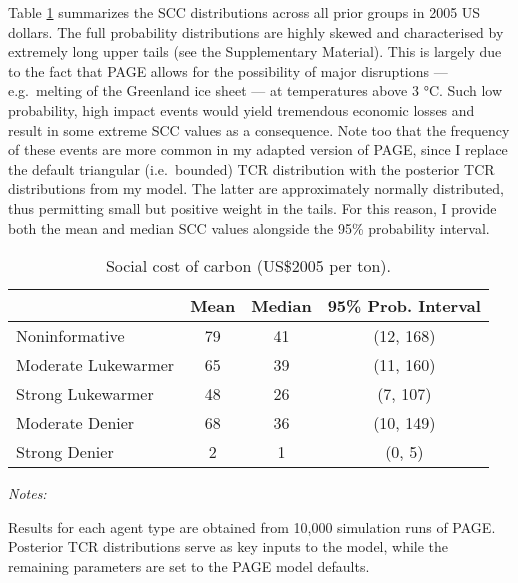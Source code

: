 \documentclass[smallextended]{svjour3}       %
\begin{document}
Table \ref{tab:scc} summarizes the SCC distributions across all prior
groups in 2005 US dollars. The full probability distributions are highly
skewed and characterised by extremely long upper tails (see the
Supplementary Material). This is largely due to the fact that PAGE
allows for the possibility of major disruptions --- e.g.~melting of the
Greenland ice sheet --- at temperatures above 3 °C. Such low
probability, high impact events would yield tremendous economic losses
and result in some extreme SCC values as a consequence. Note too that
the frequency of these events are more common in my adapted version of
PAGE, since I replace the default triangular (i.e.~bounded) TCR
distribution with the posterior TCR distributions from my model. The
latter are approximately normally distributed, thus permitting small but
positive weight in the tails. For this reason, I provide both the mean
and median SCC values alongside the 95\% probability interval.

\begin{table}

\caption{\label{tab:scc_tab}Social cost of carbon (US\$2005 per ton). \label{tab:scc}}
\centering
\begin{threeparttable}
\begin{tabular}[t]{lccc}
\toprule
 & Mean & Median & 95\% Prob. Interval\\
\midrule
Noninformative & 79 & 41 & (12, 168)\\
Moderate Lukewarmer & 65 & 39 & (11, 160)\\
Strong Lukewarmer & 48 & 26 & (7, 107)\\
Moderate Denier & 68 & 36 & (10, 149)\\
Strong Denier & 2 & 1 & (0, 5)\\
\bottomrule
\end{tabular}
\begin{tablenotes}[para]
\item \textit{Notes:} 
\item Results for each agent type are obtained from 10,000 simulation runs of PAGE. Posterior TCR distributions serve as key inputs to the model, while the remaining parameters are set to the PAGE model defaults.
\end{tablenotes}
\end{threeparttable}
\end{table}
\end{document}
